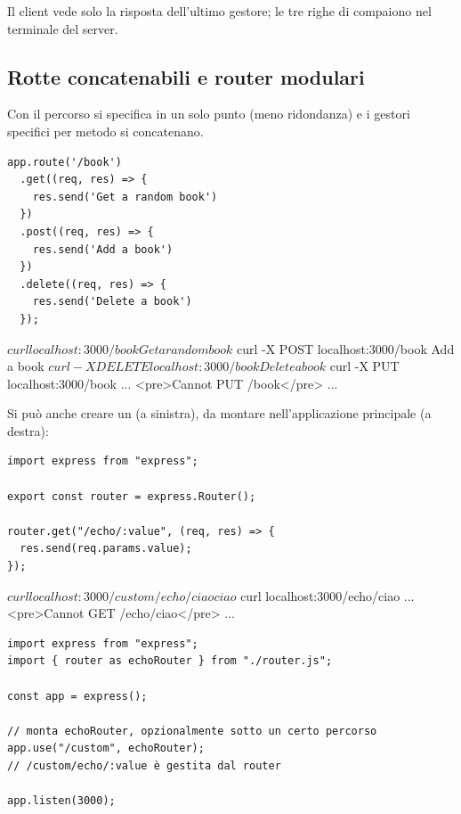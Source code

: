 Il client vede solo la risposta dell'ultimo gestore; le tre righe di
 compaiono nel terminale del server.

\subsection{Rotte concatenabili e router modulari}

Con  il percorso si specifica in un solo punto (meno
ridondanza) e i gestori specifici per metodo si concatenano.

\begin{affianco}[0.5][c]
\begin{lstlisting}[style=js, name=book.js]
app.route('/book')
  .get((req, res) => {
    res.send('Get a random book')
  })
  .post((req, res) => {
    res.send('Add a book')
  })
  .delete((req, res) => {
    res.send('Delete a book')
  });
\end{lstlisting}
\risultato
\begin{console}[Terminale]
$ curl localhost:3000/book
Get a random book
$ curl -X POST localhost:3000/book
Add a book
$ curl -X DELETE localhost:3000/book
Delete a book
$ curl -X PUT localhost:3000/book
...
<pre>Cannot PUT /book</pre>
...
\end{console}
\end{affianco}

Si può anche creare un  (a sinistra), da montare
nell'applicazione principale (a destra):

\begin{affianco}[0.45]
\begin{lstlisting}[style=js, name=router.js]
import express from "express";

export const router = express.Router();

router.get("/echo/:value", (req, res) => {
  res.send(req.params.value);
});
\end{lstlisting}
\begin{console}[Terminale]
$ curl localhost:3000/custom/echo/ciao
ciao
$ curl localhost:3000/echo/ciao
...
<pre>Cannot GET /echo/ciao</pre>
...
\end{console}
\risultato
\begin{lstlisting}[style=js, name=index.js]
import express from "express";
import { router as echoRouter } from "./router.js";

const app = express();

// monta echoRouter, opzionalmente sotto un certo percorso
app.use("/custom", echoRouter);
// /custom/echo/:value è gestita dal router

app.listen(3000);
\end{lstlisting}
\end{affianco}

